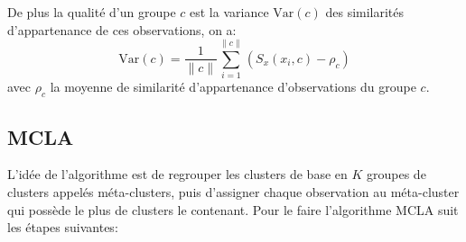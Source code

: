      	   De plus la qualité d'un groupe $c$ est la variance $\text{Var}(c)$ des similarités d'appartenance de ces observations, on a:
     	   \begin{equation}
     		   \text{Var}(c) = \frac{1}{ \|c\|} \sum_{i=1}^{\|c\|} (S_x(x_i,c) - \rho_c)
     		   \label{equa:ace3}
     	   \end{equation}
     	   avec $\rho_c$ la moyenne de similarité d'appartenance d'observations du groupe $c$.
  	 
      
     	   \subsection{\acrfull{MCLA}}

  	 
     	   L'idée de l'algorithme est de regrouper les clusters de base en $K$ groupes de clusters appelés méta-clusters, puis d'assigner chaque observation au méta-cluster qui possède le plus de clusters le contenant.
     	   Pour le faire l'algorithme MCLA suit les étapes suivantes:
     	 
